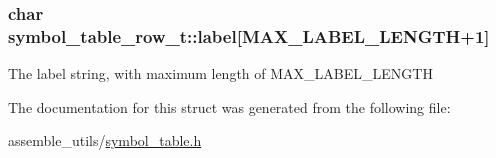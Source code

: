 \subsubsection[{\texorpdfstring{label}{label}}]{\setlength{\rightskip}{0pt plus 5cm}char symbol\+\_\+table\+\_\+row\+\_\+t\+::label\mbox{[}{\bf M\+A\+X\+\_\+\+L\+A\+B\+E\+L\+\_\+\+L\+E\+N\+G\+TH}+1\mbox{]}}\hypertarget{structsymbol__table__row__t_ac71c7d088a4544f99669c495a558ff76}{}\label{structsymbol__table__row__t_ac71c7d088a4544f99669c495a558ff76}
The label string, with maximum length of M\+A\+X\+\_\+\+L\+A\+B\+E\+L\+\_\+\+L\+E\+N\+G\+TH 

The documentation for this struct was generated from the following file\+:\begin{DoxyCompactItemize}
\item 
assemble\+\_\+utils/\hyperlink{symbol__table_8h}{symbol\+\_\+table.\+h}\end{DoxyCompactItemize}
